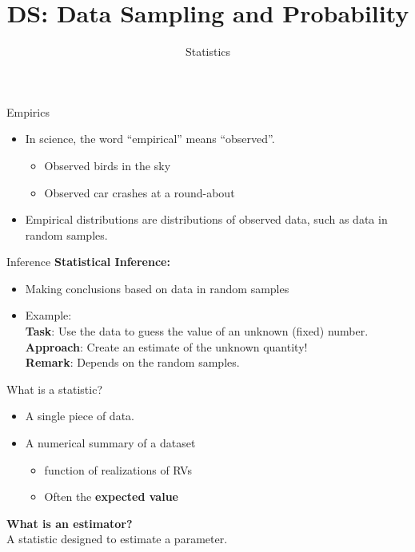 \documentclass[aspectratio=169]{../latex_main/tntbeamer}  %
\title[Statistics]{DS: Data Sampling and Probability}
\subtitle{Statistics}
\begin{document}
	
	\maketitle
	

\begin{frame}{Empirics}
    \begin{itemize}
        \item In science, the word “empirical” means “observed”.
        \begin{itemize}
            \item Observed birds in the sky
            \item Observed car crashes at a round-about
        \end{itemize}
        \item Empirical distributions are distributions of observed data, such as data in random samples.
    \end{itemize}
\end{frame}

\begin{frame}{Inference}
    \textbf{Statistical Inference:}
    \begin{itemize}
        \item Making conclusions based on data in random samples        
        \item Example:\\
        \textbf{Task}: Use the data to guess the value of an unknown (fixed) number.\\
        \textbf{Approach}: Create an estimate of the unknown quantity!\\
        \textbf{Remark}: Depends on the random samples.
    \end{itemize}
\end{frame}

\begin{frame}{What is a statistic?}
    \begin{itemize}
        \item A single piece of data.
        \item A numerical summary of a dataset 
        \begin{itemize}
            \item function of realizations of RVs
            \item Often the \textbf{expected value}
        \end{itemize}
        
    \end{itemize}
    \textbf{What is an estimator?} \\
    A statistic designed to estimate a parameter.
\end{frame}
	
\end{document}
